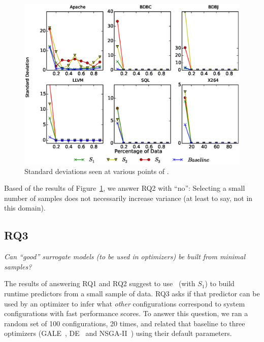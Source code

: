 \begin{figure}[t]
\includegraphics[width=\columnwidth]{Figures/Variance}
\centering
\caption{Standard deviations seen at various points of  .}\label{fig:Variance}
\end{figure}

\begin{myshadowbox}
Based of the results of Figure~\ref{fig:Variance}, we answer RQ2 with ``no'': Selecting a small number of samples does not necessarily increase variance (at least to say, not in this domain).
\end{myshadowbox}


\subsection{RQ3}

\begin{center}
{\em
Can ``good'' surrogate models (to be used in optimizers)
be built from minimal samples?}
\end{center}

The results of answering RQ1 and RQ2 suggest to use \what~(with $S_1$) to build runtime predictors from a small sample of  data. RQ3
asks if that predictor can be used by an optimizer to infer what {\em other} configurations correspond to system configurations with fast performance scores.
To answer this question,  we ran  a random set of 100 
configurations, 20 times, and related that baseline to three optimizers (GALE~\cite{krall2014gale}, DE~\cite{storn1997differential} and  NSGA-II~\cite{deb00afast}) using their
default parameters.
 
